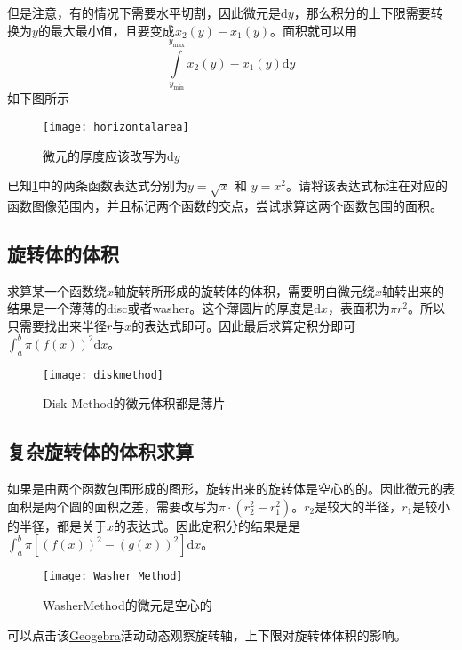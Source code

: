但是注意，有的情况下需要水平切割，因此微元是$\mathrm{d} y$，那么积分的上下限需要转换为$y$的最大最小值，且要变成$x_2(y)-x_1(y)$。面积就可以用
\[
	\int\limits_{y_{\text{min}}}^{y_{\text{max}}} x_2(y)-x_1(y) \mathrm{d} y
\]
如下图所示
\begin{figure}[H]
\centering
\texttt{[image: horizontalarea]}
\caption{微元的厚度应该改写为$\mathrm{d} y$}
\label{fig:水平切割}
\end{figure}

\begin{TaskBox}
已知\ref{fig:水平切割}中的两条函数表达式分别为$y=\sqrt x$ 和 $y=x^2$。请将该表达式标注在对应的函数图像范围内，并且标记两个函数的交点，尝试求算这两个函数包围的面积。
\end{TaskBox}

\subsection*{旋转体的体积}
求算某一个函数绕$x$轴旋转所形成的旋转体的体积，需要明白微元绕$x$轴转出来的结果是一个薄薄的disc或者washer。这个薄圆片的厚度是$\mathrm{d} x$，表面积为$\pi r^2$。所以只需要找出来半径$r$与$x$的表达式即可。因此最后求算定积分即可$\int_{a}^{b}\pi (f(x))^2 \mathrm{d} x$。
\begin{figure}[H]
\centering
\texttt{[image: diskmethod]}
\caption{Disk Method的微元体积都是薄片}
\end{figure}

\subsection*{复杂旋转体的体积求算}
如果是由两个函数包围形成的图形，旋转出来的旋转体是空心的的。因此微元的表面积是两个圆的面积之差，需要改写为$\pi\cdot (r_2^2-r_1^2)$。$r_2$是较大的半径，$r_1$是较小的半径，都是关于$x$的表达式。因此定积分的结果是是$\int_{a}^{b}\pi \left[(f(x))^2-(g(x))^2 \right]\mathrm{d} x$。
\begin{figure}[H]
\centering
\texttt{[image: Washer Method]}
\caption{WasherMethod的微元是空心的}
\end{figure}
可以点击该\href{https://www.geogebra.org/m/ysmcehhc}{Geogebra}活动动态观察旋转轴，上下限对旋转体体积的影响。

